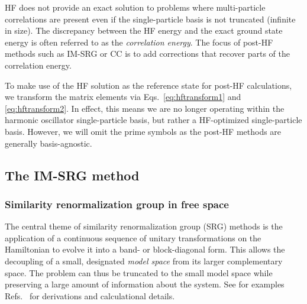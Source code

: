 \documentclass[aip, jcp, 12pt]{revtex4-1}
\begin{document}
HF does not provide an exact solution to problems where multi-particle correlations are present even if the single-particle basis is not truncated (infinite in size).  The discrepancy between the HF energy and the exact ground state energy is often referred to as the \textit{correlation energy}.  The focus of post-HF methods such as IM-SRG or CC is to add corrections that recover parts of the correlation energy.

To make use of the HF solution as the reference state for post-HF calculations, we transform the matrix elements via Eqs.\ \eqref{eq:hftransform1} and \eqref{eq:hftransform2}.  In effect, this means we are no longer operating within the harmonic oscillator single-particle basis, but rather a HF-optimized single-particle basis.  However, we will omit the prime symbols as the post-HF methods are generally basis-agnostic.

\subsection{The IM-SRG method}
\label{subsec:imsrgmethod}

\subsubsection{Similarity renormalization group in free space}
\label{subsubsec:srgmethods}

The central theme of similarity renormalization group (SRG) methods is the application of a continuous sequence of unitary transformations on the Hamiltonian to evolve it into a band- or block-diagonal form.  This allows the decoupling of a small, designated \textit{model space} from its larger complementary space.  The problem can thus be truncated to the small model space while preserving a large amount of information about the system.  See for examples Refs.\ \cite{kehrein2006flow,Hergert2016165,lnp936} for derivations and calculational details.
\end{document}
